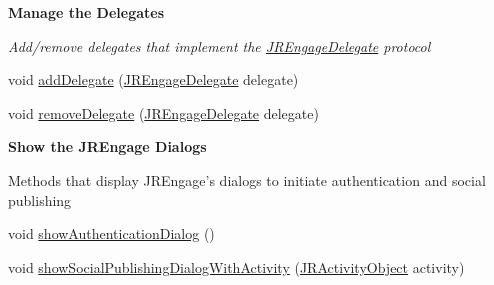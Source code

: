 \begin{Indent}{\bf Manage the Delegates}\par
{\em \label{_amgrpf6bb425cb9b7388d33e37d551db6b02e}
 Add/remove delegates that implement the \hyperlink{interfacecom_1_1janrain_1_1android_1_1engage_1_1_j_r_engage_delegate}{JREngageDelegate} protocol }\begin{DoxyCompactItemize}
\item 
void \hyperlink{classcom_1_1janrain_1_1android_1_1engage_1_1_j_r_engage_a706aaa4feb9a3b89ac99d41b2bde4d09}{addDelegate} (\hyperlink{interfacecom_1_1janrain_1_1android_1_1engage_1_1_j_r_engage_delegate}{JREngageDelegate} delegate)
\item 
void \hyperlink{classcom_1_1janrain_1_1android_1_1engage_1_1_j_r_engage_a94ccdcd629bd8b1324178c513e45a879}{removeDelegate} (\hyperlink{interfacecom_1_1janrain_1_1android_1_1engage_1_1_j_r_engage_delegate}{JREngageDelegate} delegate)
\end{DoxyCompactItemize}
\end{Indent}
\begin{Indent}{\bf Show the JREngage Dialogs}\par
{\em \label{_amgrp345603279e1df04f4a3678e78089b7be}
 \label{classcom_1_1janrain_1_1android_1_1engage_1_1_j_r_engage_showMethods}
\hypertarget{classcom_1_1janrain_1_1android_1_1engage_1_1_j_r_engage_showMethods}{}


Methods that display JREngage's dialogs to initiate authentication and social publishing }\begin{DoxyCompactItemize}
\item 
void \hyperlink{classcom_1_1janrain_1_1android_1_1engage_1_1_j_r_engage_a76041b85557ce2c3dcde6bf1bf355e91}{showAuthenticationDialog} ()
\item 
void \hyperlink{classcom_1_1janrain_1_1android_1_1engage_1_1_j_r_engage_a9959b7cde73f28daa0dfd875c549d20d}{showSocialPublishingDialogWithActivity} (\hyperlink{classcom_1_1janrain_1_1android_1_1engage_1_1types_1_1_j_r_activity_object}{JRActivityObject} activity)
\end{DoxyCompactItemize}
\end{Indent}


